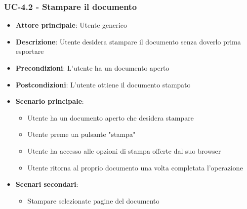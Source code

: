 \documentclass[11pt,a4paper]{article}
\begin{document}
\subsubsection{UC-4.2 - Stampare il documento}
\begin{itemize}
    \item \textbf{Attore principale}: Utente generico
    \item \textbf{Descrizione}: Utente desidera stampare il documento senza doverlo prima esportare
    \item \textbf{Precondizioni}: L'utente ha un documento aperto
    \item \textbf{Postcondizioni}: L'utente ottiene il documento stampato
    \item \textbf{Scenario principale}:
        \begin{itemize}
            \item Utente ha un documento aperto che desidera stampare
            \item Utente preme un pulsante "stampa"
            \item Utente ha accesso alle opzioni di stampa offerte dal suo browser
            \item Utente ritorna al proprio documento una volta completata l'operazione
        \end{itemize}
    \item \textbf{Scenari secondari}:
        \begin{itemize}
            \item Stampare selezionate pagine del documento
        \end{itemize}
\end{itemize}
\end{document}
